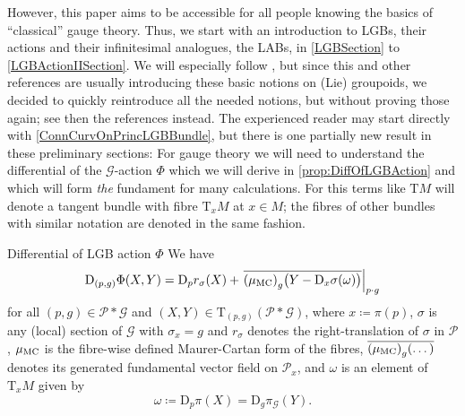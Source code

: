 \documentclass[reqno,a4paper,oneside]{amsart}
\newcounter{access}
\newcommand\MC{\mu_{{\rm MC}}}
\theoremstyle{plain}
\theoremstyle{remark}
\theoremstyle{definition}
\begin{document}
However, this paper aims to be accessible for all people knowing the basics of ``classical'' gauge theory. Thus, we start with an introduction to LGBs, their actions and their infinitesimal analogues, the LABs, in \ref{LGBSection} to \ref{LGBActionIISection}. We will especially follow \cite{mackenzieGeneralTheory}, but since this and other references are usually introducing these basic notions on (Lie) groupoids, we decided to quickly reintroduce all the needed notions, but without proving those again; see then the references instead. The experienced reader may start directly with \ref{ConnCurvOnPrincLGBBundle}, but there is one partially new result in these preliminary sections: For gauge theory we will need to understand the differential of the $\mathcal{G}$-action $\Phi$ which we will derive in \ref{prop:DiffOfLGBAction} and which will form \textit{the} fundament for many calculations. For this terms like $\mathrm{T}M$ will denote a tangent bundle with fibre $\mathrm{T}_xM$ at $x \in M$; the fibres of other bundles with similar notation are denoted in the same fashion.


\begin{propositions*}{Differential of LGB action $\Phi$}
We have
\begin{equation*}
\mathrm{D}_{(p, g)}\Phi(X, Y)
=
\mathrm{D}_pr_\sigma(X)
	+ \mleft.{\overline{\mleft( \MC\mright)_g \bigl(Y - \mathrm{D}_{x}\sigma (\omega)\bigr)}}\mright|_{p \cdot g}
\end{equation*}
for all $(p, g) \in \mathcal{P} * \mathcal{G}$ and $(X, Y) \in \mathrm{T}_{(p, g)}(\mathcal{P}*\mathcal{G})$, where $x \coloneqq \pi(p)$, $\sigma$ is any (local) section of $\mathcal{G}$ with $\sigma_{x} = g$ and $r_\sigma$ denotes the right-translation of $\sigma$ in $\mathcal{P}$, $\MC$ is the fibre-wise defined Maurer-Cartan form of the fibres, $\overline{\mleft( \MC \mright)_g(\dotsc)}$ denotes its generated fundamental vector field on $\mathcal{P}_x$, and $\omega$ is an element of $\mathrm{T}_xM$ given by
\begin{equation*}
\omega
\coloneqq
\mathrm{D}_p \pi(X)
= 
\mathrm{D}_g\pi_{\mathcal{G}}(Y).
\end{equation*}
\end{propositions*}
\end{document}
